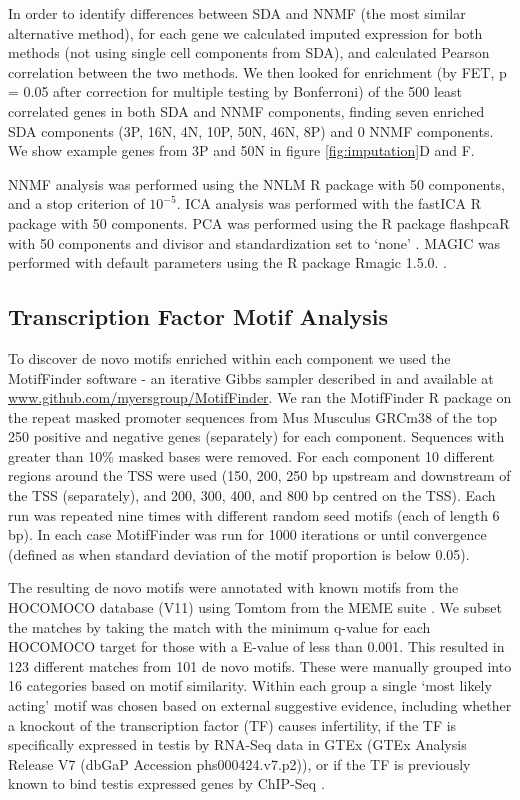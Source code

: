 In order to identify differences between SDA and NNMF (the most similar alternative method), for each gene we calculated imputed expression for both methods (not using single cell components from SDA), and calculated Pearson correlation between the two methods.
We then looked for enrichment (by FET, p = 0.05 after correction for multiple testing by Bonferroni) of the 500 least correlated genes in both SDA and NNMF components, finding seven enriched SDA components (3P, 16N, 4N, 10P, 50N, 46N, 8P) and 0 NNMF components.
We show example genes from 3P and 50N in figure \ref{fig:imputation}D and F.

NNMF analysis was performed using the NNLM R package \parencite{Lin2019NNLM} with 50 components, and a stop criterion of $10^{-5}$.
ICA analysis was performed with the fastICA R package \parencite{Marchini2017fastICA} with 50 components.
PCA was performed using the R package flashpcaR with 50 components and divisor and standardization set to ‘none’ \parencite{Abraham2014Fast}.
MAGIC was performed with default parameters using the R package Rmagic 1.5.0. \parencite{vanDijk2018Recovering}.


\subsection{Transcription Factor Motif Analysis}
\label{sec:motifs_methods}
To discover de novo motifs enriched within each component we used the MotifFinder software - an iterative Gibbs sampler described in \cite{Altemose2017map, Davies2016Reengineering} and available at \url{www.github.com/myersgroup/MotifFinder}.
We ran the MotifFinder R package on the repeat masked promoter sequences from Mus Musculus GRCm38 of the top 250 positive and negative genes (separately) for each component.
Sequences with greater than 10\% masked bases were removed.
For each component 10 different regions around the TSS were used (150, 200, 250 bp upstream and downstream of the TSS (separately), and 200, 300, 400, and 800 bp centred on the TSS).
Each run was repeated nine times with different random seed motifs (each of length 6 bp).
In each case MotifFinder was run for 1000 iterations or until convergence (defined as when standard deviation of the motif proportion is below 0.05).

The resulting de novo motifs were annotated with known motifs from the HOCOMOCO database (V11) using Tomtom from the MEME suite \parencite{Bailey2015MEME, Gupta2007Quantifying, Kulakovskiy2018HOCOMOCO}.
We subset the matches by taking the match with the minimum q-value for each HOCOMOCO target for those with a E-value of less than 0.001.
This resulted in 123 different matches from 101 de novo motifs.
These were manually grouped into 16 categories based on motif similarity.
Within each group a single ‘most likely acting’ motif was chosen based on external suggestive evidence, including whether a knockout of the transcription factor (TF) causes infertility, if the TF is specifically expressed in testis by RNA-Seq data in GTEx (GTEx Analysis Release V7 (dbGaP Accession phs000424.v7.p2)), or if the TF is previously known to bind testis expressed genes by ChIP-Seq \parencite{GTExConsortium2013GenotypeTissue}.


